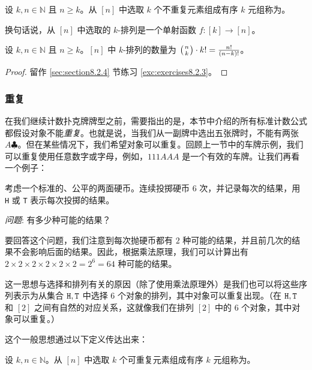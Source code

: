 \begin{definition}
    设 $k, n \in \mathbb{N}$ 且 $n \ge k$。从 $[n]$ 中选取 $k$ 个不重复元素组成有序 $k$ 元组称为。

    换句话说，从 $[n]$ 中选取的 $k$-排列是一个单射函数 $f : [k] \to [n]$。
\end{definition}

\begin{proposition}\label{prop:proposition8.2.18}
    设 $k, n \in \mathbb{N}$ 且 $n \ge k$。$[n]$ 中 $k$-排列的数量为 $\big({n \atop k}\big) \cdot k! = \frac{n!}{(n-k)!}$。
\end{proposition}

\begin{proof}
    留作 \ref{sec:section8.2.4} 节练习 \ref{exc:exercises8.2.3}。
\end{proof}

\subsubsection*{重复}

在我们继续计数扑克牌牌型之前，需要指出的是，本节中介绍的所有标准计数公式都假设对象不能\emph{重复}。也就是说，当我们从一副牌中选出五张牌时，不能有两张 $A \clubsuit$。但在某些情况下，我们希望对象可以重复。回顾上一节中的车牌示例，我们可以重复使用任意数字或字母，例如，$111AAA$ 是一个有效的车牌。让我们再看一个例子：\\

\begin{example}
    考虑一个标准的、公平的两面硬币。连续投掷硬币 $6$ 次，并记录每次的结果，用 \verb|H| 或 \verb|T| 表示每次投掷的结果。

    \emph{问题}: 有多少种可能的结果？

    要回答这个问题，我们注意到每次抛硬币都有 $2$ 种可能的结果，并且前几次的结果不会影响后面的结果。因此，根据乘法原理，我们可以计算出有 $2 \times 2 \times 2 \times 2 \times 2 \times 2 = 2^6 = 64$ 种可能的结果。
\end{example}

这一思想与选择和排列有关的原因（除了使用乘法原理外）是我们也可以将这些序列表示为从集合 ${\verb|H|, \verb|T|}$ 中选择 $6$ 个对象的排列，其中对象可以重复出现。（在 ${\verb|H|, \verb|T|}$ 和 $[2]$ 之间有自然的对应关系，这就像我们在排列 $[2]$ 中的 $6$ 个对象，其中对象可以重复。）

这个一般思想通过以下定义传达出来：

\begin{definition}
    设 $k, n \in \mathbb{N}$。从 $[n]$ 中选取 $k$ 个可重复元素组成有序 $k$ 元组称为。
\end{definition}

